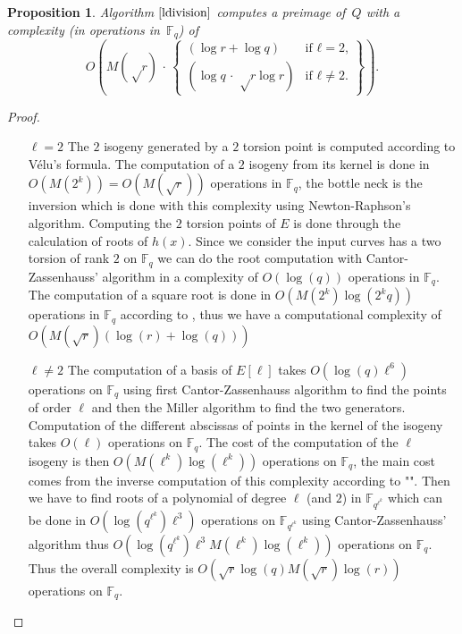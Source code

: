 \documentclass{lms}
\newtheorem{prop}[thm]{Proposition}
\def\pa#1{\left(#1\right)}
\begin{document}
\begin{prop}
Algorithm $\ref{ldivision}$ computes a preimage of~$Q$ with a complexity
(in operations in~$\mathbb{F}_q$) of
\[
O \pa{M(√r) \,· \,\left\lbrace\begin{array}{ll}
 (\log r + \log q) & \text{if $ℓ = 2$,} \\
 (\log q \,·\, √{r} \log r) & \text{if $ℓ ≠ 2$.}
\end{array}\right\rbrace}.
\]
 
\end{prop}

\begin{proof}
\begin{enumerate}
\item[$\ell = 2$]
The $2$ isogeny generated by a $2$ torsion point is computed according to Vélu's formula.
The computation of a $2$ isogeny from its kernel is done in $O(M(2^k))=O(M(\sqrt{r}))$ operations in $\mathbb{F}_q$, the bottle neck is the inversion which is done with this complexity using Newton-Raphson's algorithm.
\newline
Computing the $2$ torsion points of $E$ is done through the calculation of roots of $h(x)$.
Since we consider the input curves has a two torsion of rank $2$ on $\mathbb{F}_q$ we can do the root computation with Cantor-Zassenhauss' algorithm in a complexity of $O( \log(q))$ operations in $\mathbb{F}_q$. 
The computation of a square root is done in $O(M(2^k)\log(2^kq))$ operations in $\mathbb{F}_q$ according to \cite{DBLP:journals/dcc/DoliskaniS15}, thus we have a computational complexity of $O(M(\sqrt{r})(\log(r)+\log(q)))$
\item[$\ell \neq 2$]The computation of a basis of $E[\ell]$ takes $O(\log(q)\ell^6 )$ operations on $\mathbb{F}_q$ using first Cantor-Zassenhauss algorithm to find the points of order $\ell$ and then the Miller algorithm to find  the two generators. Computation of the different abscissas of points in the kernel of the isogeny takes $O(\ell )$ operations on $\mathbb{F}_q$. The cost of the computation of the $\ell$ isogeny is then $O(M(\ell^k)\log(\ell^k))$ operations on $\mathbb{F}_{q}$, the main cost comes from the inverse computation of this complexity according to "\cite{DeDoSc13}". Then we have to find roots of a polynomial of degree $\ell$ (and $2$) in $\mathbb{F}_{q^{\ell^k}}$ which can be done in $O(\log(q^{\ell^k})\ell^3)$ operations on $\mathbb{F}_{q^{\ell^k}}$ using Cantor-Zassenhauss' algorithm thus $O(\log(q^{\ell^k})\ell^3 M(\ell^k)\log(\ell^k))$ operations on $\mathbb{F}_q$. Thus the overall complexity is $O(\sqrt{r} \log(q) M(\sqrt{r})\log(r))$ operations on $\mathbb{F}_q$.
\end{enumerate}
\end{proof}
\end{document}
